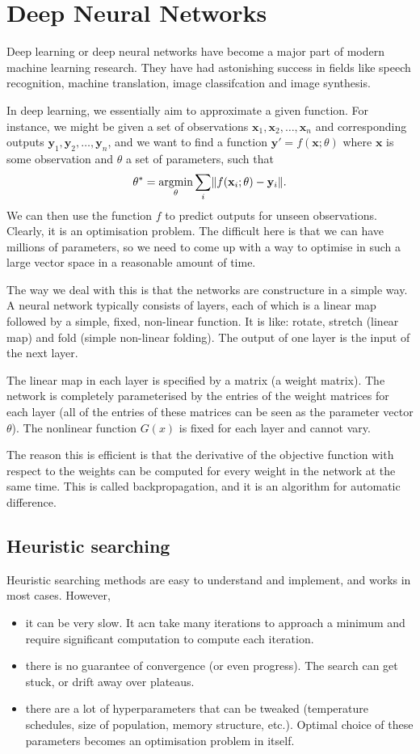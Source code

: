 \documentclass[a4paper, openany]{memoir}
\begin{document}
\section{Deep Neural Networks}
Deep learning or deep neural networks have become a major part of modern machine learning research. They have had astonishing success in fields like speech recognition, machine translation, image classifcation and image synthesis.

In deep learning, we essentially aim to approximate a given function. For instance, we might be given a set of observations $\mathbf{x}_1, \mathbf{x}_2, \dots, \mathbf{x}_n$ and corresponding outputs $\mathbf{y}_1, \mathbf{y}_2, \dots, \mathbf{y}_n$, and we want to find a function $\mathbf{y}' = f(\mathbf{x}; \theta)$ where $\mathbf{x}$ is some observation and $\theta$ a set of parameters, such that
\[\theta^* = \operatornamewithlimits{argmin}_\theta \sum_i \lVert f(\mathbf{x}_i; \theta) - \mathbf{y}_i \rVert.\]
We can then use the function $f$ to predict outputs for unseen observations. Clearly, it is an optimisation problem. The difficult here is that we can have millions of parameters, so we need to come up with a way to optimise in such a large vector space in a reasonable amount of time.

The way we deal with this is that the networks are constructure in a simple way. A neural network typically consists of layers, each of which is a linear map followed by a simple, fixed, non-linear function. It is like: rotate, stretch (linear map) and fold (simple non-linear folding). The output of one layer is the input of the next layer.

The linear map in each layer is specified by a matrix (a weight matrix). The network is completely parameterised by the entries of the weight matrices for each layer (all of the entries of these matrices can be seen as the parameter vector $\theta$). The nonlinear function $G(x)$ is fixed for each layer and cannot vary.

The reason this is efficient is that the derivative of the objective function with respect to the weights can be computed for every weight in the network at the same time. This is called backpropagation, and it is an algorithm for automatic difference.

\subsection{Heuristic searching}
Heuristic searching methods are easy to understand and implement, and works in most cases. However,
\begin{itemize}
    \item it can be very slow. It acn take many iterations to approach a minimum and require significant computation to compute each iteration.
    \item there is no guarantee of convergence (or even progress). The search can get stuck, or drift away over plateaus.
    \item there are a lot of hyperparameters that can be tweaked (temperature schedules, size of population, memory structure, etc.). Optimal choice of these parameters becomes an optimisation problem in itself.
\end{itemize}
\end{document}
